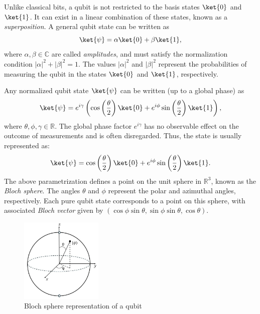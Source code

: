 \begin{definition}
  Unlike classical bits, a qubit is not restricted to the basis states \( \ket{0} \) and \( \ket{1} \). It can exist in a linear combination of these states, known as a \emph{superposition}. A general qubit state can be written as
  \[
  \ket{\psi} = \alpha \ket{0} + \beta \ket{1},
  \]
  where \( \alpha, \beta \in \mathbb{C} \) are called \emph{amplitudes}, and must satisfy the normalization condition \( |\alpha|^2 + |\beta|^2 = 1 \). The values \( |\alpha|^2 \) and \( |\beta|^2 \) represent the probabilities of measuring the qubit in the states \( \ket{0} \) and \( \ket{1} \), respectively.
\end{definition}

\begin{definition}
  Any normalized qubit state \( \ket{\psi} \) can be written (up to a global phase) as
  \[
  \ket{\psi} = e^{i \gamma} \left(\cos\left(\frac{\theta}{2}\right) \ket{0} + e^{i\phi}\sin\left(\frac{\theta}{2}\right)\ket{1}\right),
  \]
  where \( \theta, \phi, \gamma \in \mathbb{R} \). The global phase factor \( e^{i \gamma} \) has no observable effect on the outcome of measurements and is often disregarded. Thus, the state is usually represented as:
  \begin{equation} \label{eq:qubit3}
  \ket{\psi} = \cos\left(\frac{\theta}{2}\right) \ket{0} + e^{i\phi}\sin\left(\frac{\theta}{2}\right)\ket{1}.
  \end{equation}
  The above parametrization defines a point on the unit sphere in \( \mathbb{R}^3 \), known as the \emph{Bloch sphere}. The angles \( \theta \) and \( \phi \) represent the polar and azimuthal angles, respectively. Each pure qubit state corresponds to a point on this sphere, with associated \emph{Bloch vector} given by
  $(\cos \phi \sin \theta, \sin \phi \sin \theta, \cos \theta).$
\end{definition}
 
\begin{figure}[H] 
  \centering
  \includegraphics[width=0.35\textwidth]{images/bloch_sphere.jpg}
  \caption{Bloch sphere representation of a qubit}
  \label{fig:bloch_sphere}
\end{figure}

